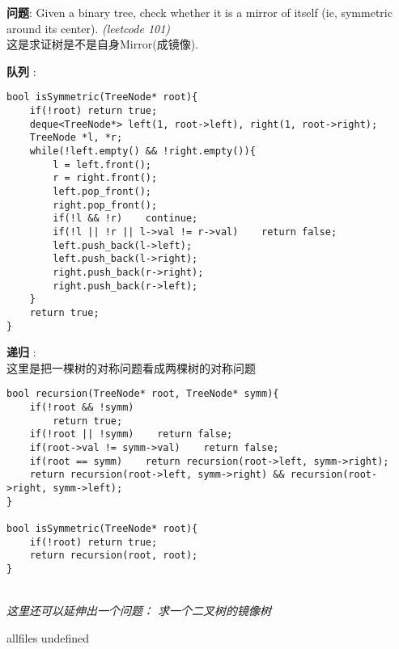 \documentclass{article}
\begin{document}
\begin{CJK}{UTF8}{gbsn}     %

\else
    
\begin{description}
    \item{\textbf{问题}}: Given a binary tree, check whether it is a mirror of itself (ie, symmetric around its center). \textit{(leetcode 101)}
    \\这是求证树是不是自身Mirror(成镜像).
    \item{\textbf{队列}} : 
    \begin{lstlisting}
bool isSymmetric(TreeNode* root){
    if(!root) return true;
    deque<TreeNode*> left(1, root->left), right(1, root->right);
    TreeNode *l, *r;
    while(!left.empty() && !right.empty()){
        l = left.front();
        r = right.front();
        left.pop_front();
        right.pop_front();
        if(!l && !r)    continue;
        if(!l || !r || l->val != r->val)    return false;
        left.push_back(l->left);
        left.push_back(l->right);
        right.push_back(r->right);
        right.push_back(r->left);
    }
    return true;
}
    \end{lstlisting}
    \item{\textbf{递归}} : 
    \\这里是把一棵树的对称问题看成两棵树的对称问题
    \begin{lstlisting}
bool recursion(TreeNode* root, TreeNode* symm){
    if(!root && !symm)
        return true;
    if(!root || !symm)    return false;
    if(root->val != symm->val)    return false;
    if(root == symm)    return recursion(root->left, symm->right);
    return recursion(root->left, symm->right) && recursion(root->right, symm->left);
}

bool isSymmetric(TreeNode* root){
    if(!root) return true;
    return recursion(root, root);
}
    \end{lstlisting}
    \textit{\\这里还可以延伸出一个问题： 求一个二叉树的镜像树}
\end{description}

\fi

\ifx allfiles undefined
\end{CJK}
\end{document}
